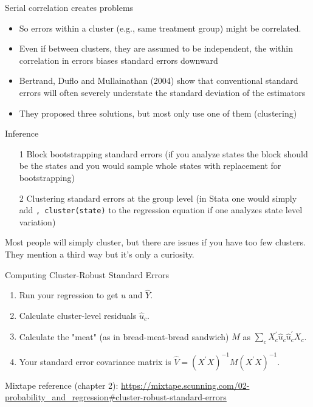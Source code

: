\documentclass{beamer}
\begin{document}
\begin{frame}{Serial correlation creates problems}
  \begin{itemize}
    \item So errors within a cluster (e.g., same treatment group) might be correlated.
    \item Even if between clusters, they are assumed to be independent, the within correlation in errors biases standard errors downward
	\item  Bertrand, Duflo and Mullainathan (2004) show that conventional standard errors will often severely understate the standard deviation of the estimators
	\item They proposed three solutions, but most only use one of them (clustering)

  \end{itemize}
\end{frame}




\begin{frame}{Inference}
	
		\begin{enumerate}
		\item[1 ] Block bootstrapping standard errors (if you analyze states the block should be the states and you would sample whole states with replacement for bootstrapping)
		\item[2 ] Clustering standard errors at the group level (in Stata one would simply add \texttt{, cluster(state)} to the regression equation if one analyzes state level variation)
		\end{enumerate}

\bigskip

Most people will simply cluster, but there are issues if you have too few clusters. They mention a third way but it's only a curiosity.
		
\end{frame}


\begin{frame}{Computing Cluster-Robust Standard Errors}
  \begin{enumerate}
    \item Run your regression to get \( u \) and \( \hat{Y} \).
    \item Calculate cluster-level residuals \( \hat{u}_c \).
    \item Calculate the "meat" (as in bread-meat-bread sandwich) \( M \) as \( \sum_c X_c^\prime \hat{u}_c \hat{u}_c^\prime X_c \).
    \item Your standard error covariance matrix is \( \hat{V} = (X^\prime X)^{-1} M (X^\prime X)^{-1} \).
  \end{enumerate}
  
  \bigskip
  
  Mixtape reference (chapter 2): \url{https://mixtape.scunning.com/02-probability\_and\_regression\#cluster-robust-standard-errors}
\end{frame}
\end{document}

